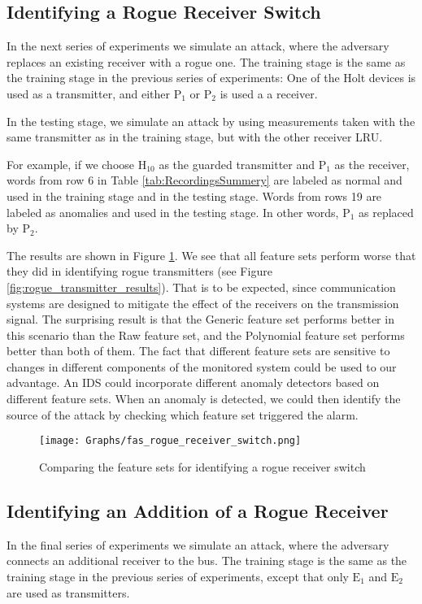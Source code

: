 \documentclass[conference]{IEEEtran}
\begin{document}
\subsection{Identifying a Rogue Receiver Switch}
  In the next series of experiments we simulate an attack, where the adversary replaces an existing receiver with a rogue one. The training stage is the same as the training stage in the previous series of experiments: One of the Holt devices is used as a transmitter, and either \(\text{P}_1\) or \(\text{P}_2\) is used a a receiver.
  
  In the testing stage, we simulate an attack by using measurements taken with the same transmitter as in the training stage, but with the other receiver LRU.
  
  For example, if we choose \(\text{H}_{10}\) as the guarded transmitter and \(\text{P}_1\) as the receiver, words from row 6 in Table \ref{tab:RecordingsSummery} are labeled as normal and used in the training stage and in the testing stage. Words from rows 19 are labeled as anomalies and used in the testing stage. In other words, \(\text{P}_1\) as replaced by \(\text{P}_2\).
  
  The results are shown in Figure \ref{fig:receiver_results}. We see that all feature sets perform worse that they did in identifying rogue transmitters (see Figure \ref{fig:rogue_transmitter_results}). That is to be expected, since communication systems are designed to mitigate the effect of the receivers on the transmission signal. The surprising result is that the Generic feature set performs better in this scenario than the Raw feature set, and the Polynomial feature set performs better than both of them. The fact that different feature sets are sensitive to changes in different components of the monitored system could be used to our advantage. An IDS could incorporate different anomaly detectors based on different feature sets. When an anomaly is detected, we could then identify the source of the attack by checking which feature set triggered the alarm.
  
  \begin{figure}[t]
    \centering
    \texttt{[image: Graphs/fas\_rogue\_receiver\_switch.png]}
    \caption{Comparing the feature sets for identifying a rogue receiver switch}
    \label{fig:receiver_results}
  \end{figure}
  
\subsection{Identifying an Addition of a Rogue Receiver}
  In the final series of experiments we simulate an attack, where the adversary connects an additional receiver to the bus. The training stage is the same as the training stage in the previous series of experiments, except that only \(\text{E}_1\) and \(\text{E}_2\) are used as transmitters.
  
\end{document}
